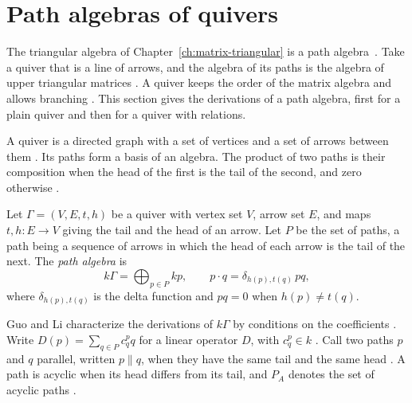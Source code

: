 \section{Path algebras of quivers}\label{sec:path-incidence:path}

The triangular algebra of Chapter~\ref{ch:matrix-triangular} is a path
algebra~\cite[p.~81]{LiWei2018}. Take a quiver that is a line of arrows, and the algebra of its paths
is the algebra of upper triangular matrices \cite[Example~2.1,
p.~126]{LiWei2018}. A quiver keeps the order of the matrix algebra and allows
branching \cite[p.~81]{LiWei2018}. This section gives the derivations of a
path algebra, first for a plain quiver and then for a quiver with relations.

A quiver is a directed graph with a set of vertices and a set of arrows
between them \cite[p.~547]{GuoLi2014}. Its paths form a basis of an algebra.
The product of two paths is their composition when the head of the first is
the tail of the second, and zero otherwise \cite[p.~547]{GuoLi2014}.

\begin{definition}\label{def:path:algebra}
Let $\Gamma=(V,E,t,h)$ be a quiver with vertex set $V$, arrow set $E$, and maps
$t,h\colon E\to V$ giving the tail and the head of an arrow. Let $P$ be the set of
paths, a path being a sequence of arrows in which the head of each arrow is the tail
of the next. The \emph{path algebra} is
\begin{equation*}
k\Gamma=\bigoplus_{p\in P}kp,\qquad
p\cdot q=\delta_{h(p),t(q)}\,pq,
\end{equation*}
where $\delta_{h(p),t(q)}$ is the delta function and $pq=0$ when $h(p)\neq t(q)$.
\end{definition}

Guo and Li characterize the derivations of $k\Gamma$ by conditions on the
coefficients \cite[p.~548]{GuoLi2014}. Write $D(p)=\sum_{q\in P}c^{p}_{q}q$
for a linear operator $D$, with $c^{p}_{q}\in k$ \cite[p.~548]{GuoLi2014}.
Call two paths $p$ and $q$ parallel, written $p\parallel q$, when they have
the same tail and the same head \cite[p.~548]{GuoLi2014}. A path is acyclic
when its head differs from its tail, and $P_{A}$ denotes the set of acyclic
paths \cite[p.~548]{GuoLi2014}.

